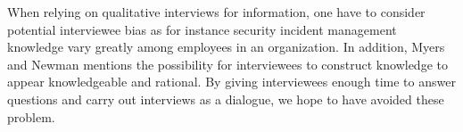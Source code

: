 When relying on qualitative interviews for information, one have to consider potential interviewee bias as for instance security incident management knowledge vary greatly among employees in an organization. In addition, Myers and Newman mentions the possibility for interviewees to construct knowledge to appear knowledgeable and rational. By giving interviewees enough time to answer questions and carry out interviews as a dialogue, we hope to have avoided these problem.




